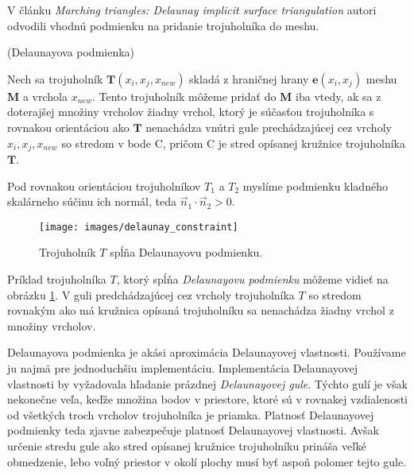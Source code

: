 V článku \textit{Marching triangles: Delaunay implicit surface triangulation} \cite{hilton1997marching}
autori odvodili vhodnú podmienku na pridanie trojuholníka do meshu.

\begin{definition}
    (Delaunayova podmienka)
    \label{def:delaunay_constraint}

    Nech sa trojuholník $\mathbf{T}(x_i, x_j, x_{new})$ skladá z hraničnej hrany $\mathbf{e}(x_i, x_j)$ 
    meshu $\mathbf{M}$ a vrchola $x_{new}$. Tento trojuholník môžeme pridať do 
    $\mathbf{M}$ iba vtedy, ak sa z doterajšej 
    množiny vrcholov žiadny vrchol, ktorý je súčasťou trojuholníka s rovnakou orientáciou ako 
    $\mathbf{T}$ nenachádza vnútri gule prechádzajúcej cez vrcholy $x_i, x_j, x_{new}$ so stredom 
    v bode C, pričom C je stred opísanej kružnice trojuholníka $\mathbf{T}$.
\end{definition}

    Pod rovnakou orientáciou 
    trojuholníkov $T_1$ a $T_2$ myslíme podmienku kladného skalárneho súčinu ich normál, teda 
    $\vec{n}_1 \cdot \vec{n}_2 > 0$.

\begin{figure}
    \centerline{\texttt{[image: images/delaunay\_constraint]}}
    \caption[Trojuholník $T$ spĺňajúci Delaunayovu podmienku]
    {\cite{hilton1996marching} Trojuholník $T$ spĺňa Delaunayovu podmienku.}
    \label{obr:delaunay_constraint}
\end{figure}

Príklad trojuholníka $T$, ktorý spĺňa \textit{Delaunayovu podmienku} môžeme vidieť na obrázku 
\ref{obr:delaunay_constraint}. V guli predchádzajúcej cez vrcholy trojuholníka $T$ so stredom 
rovnakým ako má kružnica opísaná trojuholníku sa nenachádza žiadny vrchol z množiny vrcholov.

Delaunayova podmienka je akási aproximácia Delaunayovej vlastnosti. Používame ju najmä pre jednoduchšiu
implementáciu. Implementácia Delaunayovej vlastnosti by vyžadovala
hľadanie prázdnej \textit{Delaunayovej gule}. Týchto gulí je však nekonečne veľa, keďže množina
bodov v priestore, ktoré sú v rovnakej vzdialenosti od všetkých troch vrcholov trojuholníka je priamka.
Platnosť Delaunayovej podmienky teda zjavne zabezpečuje platnosť Delaunayovej vlastnosti.
Avšak určenie stredu gule ako stred opísanej kružnice trojuholníku prináša veľké obmedzenie,
lebo voľný priestor v okolí plochy musí byť aspoň polomer tejto gule. 

